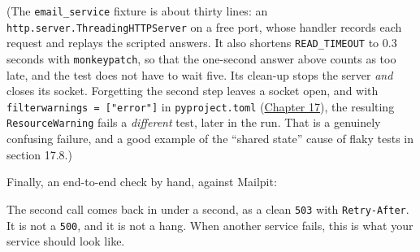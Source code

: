 \noindent{}(The \texttt{email\_service} fixture is about thirty lines: an \texttt{http.}\allowbreak{}\texttt{server.}\allowbreak{}\texttt{ThreadingHTTPServer} on a free port, whose handler records each request and replays the scripted answers. It also shortens \texttt{READ\_TIMEOUT} to 0.3 seconds with \texttt{monkeypatch}, so that the one-second answer above counts as too late, and the test does not have to wait five. Its clean-up stops the server \emph{and} closes its socket. Forgetting the second step leaves a socket open, and with \texttt{filterwarnings\ =}\allowbreak{}\texttt{\ {[}"error"{]}} in \texttt{pyproject.toml} (\hyperref[ch:17-build-process]{Chapter 17}), the resulting \texttt{ResourceWarning} fails a \emph{different} test, later in the run. That is a genuinely confusing failure, and a good example of the ``shared state'' cause of flaky tests in section 17.8.)

Finally, an end-to-end check by hand, against Mailpit:

\begin{codebox}[short]

\begin{Shaded}
\begin{Highlighting}[]
\ExtensionTok{$} \DataTypeTok{\textbackslash{}}
       
\ExtensionTok{\{}\ExtensionTok{:}\ExtensionTok{\}}

\ExtensionTok{$}
\ExtensionTok{$} \DataTypeTok{\textbackslash{}}
       
\ExtensionTok{\{}\ExtensionTok{:}\ExtensionTok{\}}
\end{Highlighting}
\end{Shaded}

\end{codebox}

\noindent{}The second call comes back in under a second, as a clean \texttt{503} with \texttt{Retry-After}. It is not a \texttt{500}, and it is not a hang. When another service fails, this is what your service should look like.

